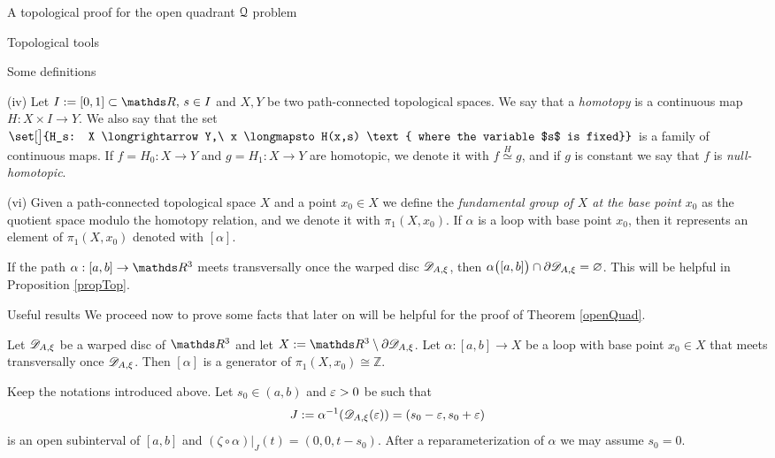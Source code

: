 \documentclass[11pt, a4paper, english, twoside, notitlepage, openright]{report}
\begin{document}
\begin{chapter}{A topological proof for the open quadrant $\mathcal{Q}$ problem}
\begin{section}{Topological tools}
\begin{subsection}{Some definitions}
\begin{definitions}
(iv) Let $I:=[0,1]\subset\R,\, s\in I$ and $X, Y$ be two path-connected topological spaces. We say that a \emph{homotopy} is a continuous map $H: X\times I\longrightarrow Y$. We also say that the set $\set[\big]{H_s: X \longrightarrow Y,\ x \longmapsto H(x,s) \text{ where the variable $s$ is fixed}}$ is a family of continuous maps. If $f=H_0:X\longrightarrow Y$ and $g=H_1:X\longrightarrow Y$ are homotopic, we denote it with $f \overset{H}{\simeq}g$, and if $g$ is constant we say that $f$ is \emph{null-homotopic}.

(vi) Given a path-connected topological space $X$ and a point $x_0\in X$ we define the \emph{fundamental group of $X$ at the base point $x_0$} as the quotient space modulo the homotopy relation, and we denote it with $\pi_1(X,x_0)$. If $\alpha$ is a loop with base point $x_0$, then it represents an element of $\pi_1(X,x_0)$ denoted with $[\alpha]$.
\end{definitions}

\begin{remark}\label{remPath}
If the path $\alpha:[a,b]\to\R^3$ meets transversally once the warped disc $\mathscr{D}_{A,\xi}$, then $\alpha\big([a,b]\big)\cap\partial\mathscr{D}_{A,\xi}=\varnothing$. This will be helpful in Proposition \ref{propTop}.
\end{remark}
\end{subsection}

\begin{subsection}{Useful results}
We proceed now to prove some facts that later on will be helpful for the proof of Theorem \ref{openQuad}.
\begin{lemma}\label{lemmaFundGr}
Let $\mathscr{D}_{A,\xi}$ be a warped disc of $\R^3$ and let $X:=\R^3\setminus\partial\D_{A,\xi}$. Let $\alpha:[a,b]\to X$ be a loop with base point $x_0\in X$ that meets transversally once $\mathscr{D}_{A,\xi}$. Then $[\alpha]$ is a generator of $\pi_1(X,x_0)\cong{\mathbb Z}$.
\begin{Proof} 
Keep the notations introduced above. Let $s_0\in(a,b)$ and $\varepsilon>0$ be such that 
$$
J:=\alpha^{-1}(\mathscr{D}_{A,\xi}(\varepsilon))=(s_0-\varepsilon,s_0+\varepsilon)
$$ 
is an open subinterval of $[a,b]$ and $(\zeta\circ\alpha)|_J(t)=(0,0,t-s_0)$. After a reparameterization of $\alpha$ we may assume $s_0=0$.


\end{Proof}
\end{lemma}
\end{subsection}
\end{section}
\end{chapter}
\end{document}
